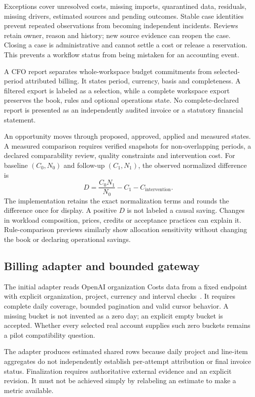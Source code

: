 \documentclass[10pt,twocolumn]{article}
\begin{document}
Exceptions cover unresolved costs, missing imports, quarantined data, residuals, missing drivers, estimated sources and pending outcomes. Stable case identities prevent repeated observations from becoming independent incidents. Reviews retain owner, reason and history; new source evidence can reopen the case. Closing a case is administrative and cannot settle a cost or release a reservation. This prevents a workflow status from being mistaken for an accounting event.

A CFO report separates whole-workspace budget commitments from selected-period attributed billing. It states period, currency, basis and completeness. A filtered export is labeled as a selection, while a complete workspace export preserves the book, rules and optional operations state. No complete-declared report is presented as an independently audited invoice or a statutory financial statement.

An opportunity moves through proposed, approved, applied and measured states. A measured comparison requires verified snapshots for non-overlapping periods, a declared comparability review, quality constraints and intervention cost. For baseline $(C_0,N_0)$ and follow-up $(C_1,N_1)$, the observed normalized difference is
\begin{equation}
D=\frac{C_0N_1}{N_0}-C_1-C_{\mathrm{intervention}}.
\label{eq:difference}
\end{equation}
The implementation retains the exact normalization terms and rounds the difference once for display. A positive $D$ is not labeled a causal saving. Changes in workload composition, prices, credits or acceptance practices can explain it. Rule-comparison previews similarly show allocation sensitivity without changing the book or declaring operational savings.

\subsection{Billing adapter and bounded gateway}

The initial adapter reads OpenAI organization Costs data from a fixed endpoint with explicit organization, project, currency and interval checks~\cite{openaicosts}. It requires complete daily coverage, bounded pagination and valid cursor behavior. A missing bucket is not invented as a zero day; an explicit empty bucket is accepted. Whether every selected real account supplies such zero buckets remains a pilot compatibility question.

The adapter produces estimated shared rows because daily project and line-item aggregates do not independently establish per-attempt attribution or final invoice status. Finalization requires authoritative external evidence and an explicit revision. It must not be achieved simply by relabeling an estimate to make a metric available.
\end{document}
